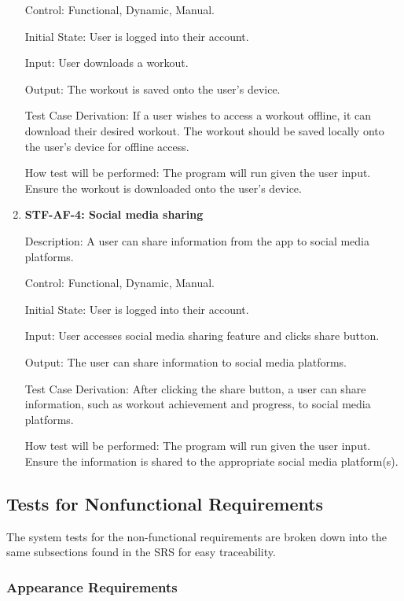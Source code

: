 \documentclass[12pt, titlepage]{article}
\begin{document}
\begin{enumerate}
Control: Functional, Dynamic, Manual.

Initial State: User is logged into their account.

Input: User downloads a workout.

Output: The workout is saved onto the user’s device. 

Test Case Derivation: If a user wishes to access a workout offline, it can download their desired workout. The workout should be saved locally onto the user’s device for offline access.

How test will be performed: The program will run given the user input. Ensure the workout is downloaded onto the user’s device.

\item{\textbf{STF-AF-4: Social media sharing}\\}

Description: A user can share information from the app to social media platforms. 

Control: Functional, Dynamic, Manual.

Initial State: User is logged into their account.

Input: User accesses social media sharing feature and clicks share button.

Output: The user can share information to social media platforms. 

Test Case Derivation: After clicking the share button, a user can share information, such as workout achievement and progress, to social media platforms.

How test will be performed: The program will run given the user input. Ensure the information is shared to the appropriate social media platform(s).


\end{enumerate}

\subsection{Tests for Nonfunctional Requirements}

The system tests for the non-functional requirements are broken down into the same subsections found in the SRS for easy traceability.

\subsubsection{Appearance Requirements }
\end{document}
